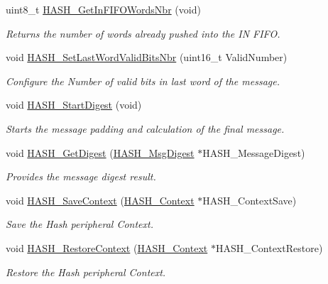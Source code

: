 \begin{DoxyCompactItemize}
uint8\-\_\-t \hyperlink{group___h_a_s_h_ga37bec5e637a57124f3179185d03537ab}{H\-A\-S\-H\-\_\-\-Get\-In\-F\-I\-F\-O\-Words\-Nbr} (void)
\begin{DoxyCompactList}\small\item\em Returns the number of words already pushed into the I\-N F\-I\-F\-O. \end{DoxyCompactList}\item 
void \hyperlink{group___h_a_s_h_gac4d1fa51c9240ad0287b371564b5d2a6}{H\-A\-S\-H\-\_\-\-Set\-Last\-Word\-Valid\-Bits\-Nbr} (uint16\-\_\-t Valid\-Number)
\begin{DoxyCompactList}\small\item\em Configure the Number of valid bits in last word of the message. \end{DoxyCompactList}\item 
void \hyperlink{group___h_a_s_h_ga84ac2b64179fd37b75c4d5f665126e93}{H\-A\-S\-H\-\_\-\-Start\-Digest} (void)
\begin{DoxyCompactList}\small\item\em Starts the message padding and calculation of the final message. \end{DoxyCompactList}\item 
void \hyperlink{group___h_a_s_h_ga23018d770837d6ab9f46941f105cc017}{H\-A\-S\-H\-\_\-\-Get\-Digest} (\hyperlink{struct_h_a_s_h___msg_digest}{H\-A\-S\-H\-\_\-\-Msg\-Digest} $\ast$H\-A\-S\-H\-\_\-\-Message\-Digest)
\begin{DoxyCompactList}\small\item\em Provides the message digest result. \end{DoxyCompactList}\item 
void \hyperlink{group___h_a_s_h_ga9432b2b66e223414c840e9313c388bc5}{H\-A\-S\-H\-\_\-\-Save\-Context} (\hyperlink{struct_h_a_s_h___context}{H\-A\-S\-H\-\_\-\-Context} $\ast$H\-A\-S\-H\-\_\-\-Context\-Save)
\begin{DoxyCompactList}\small\item\em Save the Hash peripheral Context. \end{DoxyCompactList}\item 
void \hyperlink{group___h_a_s_h_ga1d8412a13601376c968aec63212ca54e}{H\-A\-S\-H\-\_\-\-Restore\-Context} (\hyperlink{struct_h_a_s_h___context}{H\-A\-S\-H\-\_\-\-Context} $\ast$H\-A\-S\-H\-\_\-\-Context\-Restore)
\begin{DoxyCompactList}\small\item\em Restore the Hash peripheral Context. \end{DoxyCompactList}\item 

\end{DoxyCompactItemize}
